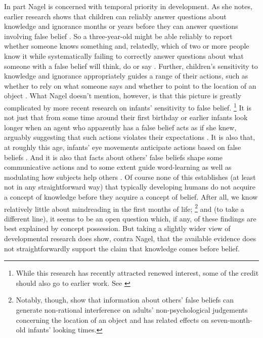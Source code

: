 \documentclass[11pt,a4paper]{extarticle}
\begin{document}
In part Nagel is concerned with temporal priority in development.
As she notes, earlier research shows that
children can reliably answer questions about knowledge and ignorance months or years before they can answer questions involving false belief \citep{hogrefe_ignorance_1986}.
So a three-year-old might be able reliably to report whether someone knows something and, relatedly, which of two or more people know it while systematically failing to correctly answer questions about what someone with a false belief will think, do or say \citep{Wellman:2001lz}.
Further, children's sensitivity to knowledge and ignorance appropriately guides a range of their actions, such as whether to rely on what someone says \citep{Robinson:1999sq,Robinson:2003bh} and whether to point to the location of an object \citep{Dunham:2000tv,Liszkowski:2008al}.
What Nagel doesn't mention, however, is that this picture is greatly complicated by more recent research on infants' sensitivity to false belief.%
\footnote{
While this research has recently attracted renewed interest, some of the credit should also go to earlier work. 
See \citet{Clements:1994cw,Garnham:2001jm,Garnham:2001ql,Ruffman:2001ng}
}
It is not just that from some time around their first birthday or earlier infants look longer when an agent who apparently has a false belief acts as if she knew, arguably suggesting that such actions violates their expectations  \citep{Onishi:2005hm,Surian:2007hl}.
It is also that, at roughly this age, infants' eye movements anticipate actions based on false beliefs \citep{Southgate:2007js}.
And it is also that facts about others' false beliefs shape some communicative actions \citep{Knudsen:2011fk} and to some extent guide word-learning \citep{Carpenter:2002gc} as well as modulating how subjects help others \citep{Buttelmann:2009gy}.
Of course none of this establishes (at least not in any straightforward way) that typically developing humans do not acquire a concept of knowledge before they acquire a concept of belief.
After all, we know relatively little about mindreading in the first months of life;%
\footnote{
Notably, though, \citet{kovacs_social_2010} show that information about others' false beliefs can generate non-rational interference on adults' non-psychological judgements concerning the location of an object and has related effects on seven-month-old infants' looking times.
}
 and (to take a different line), it seems to be an open question which, if any, of these findings are best explained by concept possession. 
But taking a slightly wider view of developmental research does show, contra Nagel, that the available evidence does not  straightforwardly support the claim that knowledge comes before belief.
\end{document}
